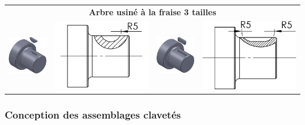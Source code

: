 \documentclass[11pt,oneside]{article}
\begin{document}
\begin{center}
\begin{tabular}{m{2cm}m{5cm}m{2cm}m{5cm}}
\multicolumn{4}{c}{\textbf{Arbre usiné à la fraise 3 tailles}} \\
\includegraphics[width=2cm]{png/rainure3_3d}&
\includegraphics[width=5cm]{png/rainure3}&
\includegraphics[width=2cm]{png/rainure4_3d}&
\includegraphics[width=5cm]{png/rainure4}
\end{tabular}
\end{center}


\subsubsection{Conception des assemblages clavetés}
\end{document}
